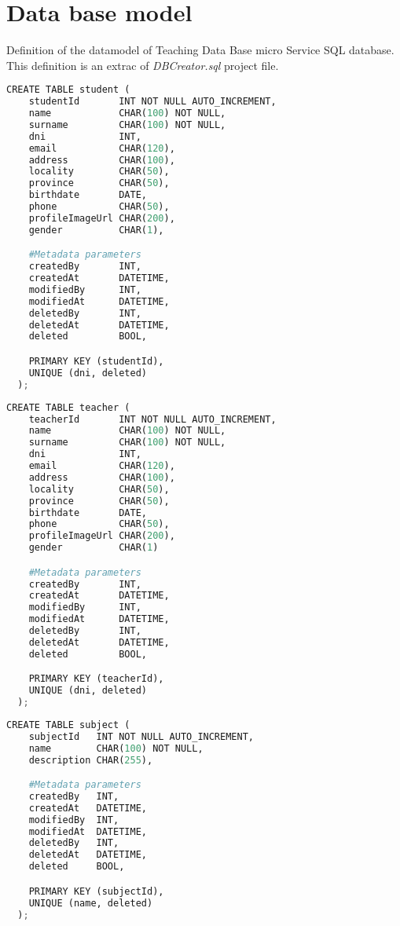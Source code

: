 \chapter{Data base model}

Definition of the datamodel of Teaching Data Base micro Service SQL
database. This definition is an extrac of \textit{DBCreator.sql}
project file.


\begin{lstlisting}[language=python,frame=none]
  CREATE TABLE student (
    studentId       INT NOT NULL AUTO_INCREMENT,
    name            CHAR(100) NOT NULL,
    surname         CHAR(100) NOT NULL,
    dni             INT,
    email           CHAR(120),
    address         CHAR(100),
    locality        CHAR(50),
    province        CHAR(50),
    birthdate       DATE,
    phone           CHAR(50),
    profileImageUrl CHAR(200),
    gender          CHAR(1),

    #Metadata parameters
    createdBy       INT,
    createdAt       DATETIME,
    modifiedBy      INT,
    modifiedAt      DATETIME,
    deletedBy       INT,
    deletedAt       DATETIME,
    deleted         BOOL,

    PRIMARY KEY (studentId),
    UNIQUE (dni, deleted)
  );
\end{lstlisting}

\begin{lstlisting}[language=python,frame=none]
  CREATE TABLE teacher (
    teacherId       INT NOT NULL AUTO_INCREMENT,
    name            CHAR(100) NOT NULL,
    surname         CHAR(100) NOT NULL,
    dni             INT,
    email           CHAR(120),
    address         CHAR(100),
    locality        CHAR(50),
    province        CHAR(50),
    birthdate       DATE,
    phone           CHAR(50),
    profileImageUrl CHAR(200),
    gender          CHAR(1)

    #Metadata parameters
    createdBy       INT,
    createdAt       DATETIME,
    modifiedBy      INT,
    modifiedAt      DATETIME,
    deletedBy       INT,
    deletedAt       DATETIME,
    deleted         BOOL,

    PRIMARY KEY (teacherId),
    UNIQUE (dni, deleted)
  );
\end{lstlisting}


\begin{lstlisting}[language=python,frame=none]
  CREATE TABLE subject (
    subjectId   INT NOT NULL AUTO_INCREMENT,
    name        CHAR(100) NOT NULL,
    description CHAR(255),

    #Metadata parameters
    createdBy   INT,
    createdAt   DATETIME,
    modifiedBy  INT,
    modifiedAt  DATETIME,
    deletedBy   INT,
    deletedAt   DATETIME,
    deleted     BOOL,

    PRIMARY KEY (subjectId),
    UNIQUE (name, deleted)
  );
\end{lstlisting}


